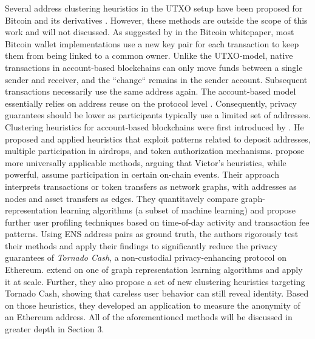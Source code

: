 \documentclass[12pt,a4paper,titlepage,oneside,english]{article}
\begin{document}
Several address clustering heuristics in the UTXO setup have been proposed for Bitcoin and its derivatives \citep{Androulaki2013, Meiklejohn2013, Haslhofer2016, jourdan2018, kappos2022}. However, these methods are outside the scope of this work and will not discussed. \newline 
As suggested by \cite{nakamotoBitcoin2008} in the Bitcoin whitepaper, most Bitcoin wallet implementations use a new key pair for each transaction to keep them from being linked to a common owner. Unlike the UTXO-model, native transactions in account-based blockchains can only move funds between a single sender and receiver, and the ``change`` remains in the sender account. Subsequent transactions necessarily use the same address again. The account-based model essentially relies on address reuse on the protocol level \citep{Beres2020}. Consequently, privacy guarantees should be lower as participants typically use a limited set of addresses. \newline
Clustering heuristics for account-based blockchains were first introduced by \cite{FV:17}. He proposed and applied heuristics that exploit patterns related to deposit addresses, multiple participation in airdrops, and token authorization mechanisms. \newline
\cite{Beres2020} propose more universally applicable methods, arguing that Victor’s heuristics, while powerful, assume participation in certain on-chain events. Their approach interprets transactions or token transfers as network graphs, with addresses as nodes and asset transfers as edges. They quantitavely compare graph-representation learning algorithms (a subset of machine learning) and propose further user profiling techniques based on time-of-day activity and transaction fee patterns. Using ENS address pairs as ground truth, the authors rigorously test their methods and apply their findings to significantly reduce the privacy guarantees of \textit{Tornado Cash}, a non-custodial privacy-enhancing protocol on Ethereum. \newline
\cite{wu2022tutela} extend on one of \cite{Beres2020} graph representation learning %
 algorithms and apply it at scale. Further, they also propose a set of new clustering heuristics targeting Tornado Cash,  showing that careless user behavior can still reveal identity. Based on those heuristics, they developed an application to measure the anonymity of an Ethereum address. \newline All of the aforementioned methods will be discussed in greater depth in Section 3. \newline
\end{document}
